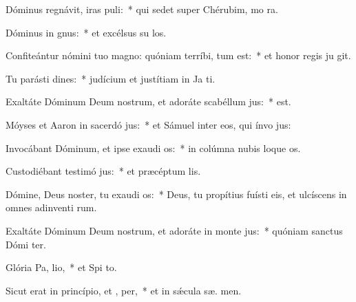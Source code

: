 \item Dóminus regnávit, iras puli:~* qui sedet super Chérubim, mo ra.
\item Dóminus in  gnus:~* et excélsus su  los.
\item Confiteántur nómini tuo magno: quóniam terríbi,  tum est:~* et honor regis ju git.
\item Tu parásti dines:~* judícium et justítiam in Ja  ti.
\item Exaltáte Dóminum Deum nostrum, et adoráte scabéllum  jus:~*   est.
\item Móyses et Aaron in sacerdó jus:~* et Sámuel inter eos, qui ínvo  jus:
\item Invocábant Dóminum, et ipse exaudi os:~* in colúmna nubis loque  os.
\item Custodiébant testimó jus:~* et præcéptum   lis.
\item Dómine, Deus noster, tu exaudi os:~* Deus, tu propítius fuísti eis, et ulcíscens in omnes adinventi rum.
\item Exaltáte Dóminum Deum nostrum, et adoráte in monte  jus:~* quóniam sanctus Dómi  ter.
\item Glória Pa,  lio,~* et Spi to.
\item Sicut erat in princípio, et ,  per,~* et in sǽcula sæ. men.
